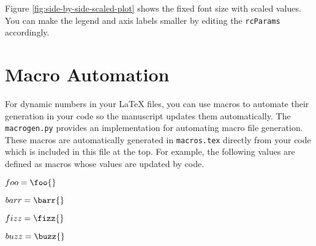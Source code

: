 \documentclass[12pt,twocolumn]{article}
\begin{document}
Figure \ref{fig:side-by-side-scaled-plot} shows the fixed font size with scaled values.
%
You can make the legend and axis labels smaller by editing the \texttt{rcParams} accordingly.


\section{Macro Automation}

For dynamic numbers in your \LaTeX{} files, you can use macros to automate their generation in your code so the manuscript updates them automatically.
%
The \texttt{macrogen.py} provides an implementation for automating macro file generation.
%
These macros are automatically generated in \texttt{macros.tex} directly from your code which is included in this file at the top.
%
For example, the following values are defined as macros whose values are updated by code.


$foo = \foo{}$

$barr = \barr{}$

$fizz = \fizz{}$

$buzz = \buzz{}$
\end{document}
